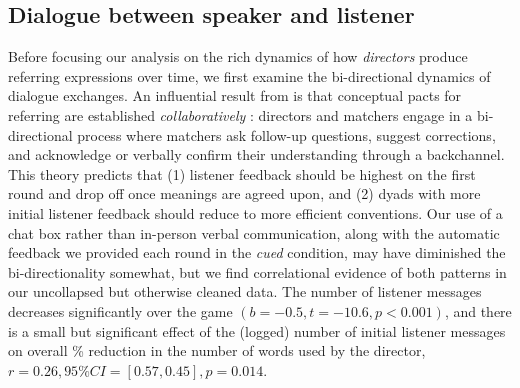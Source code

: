 \subsection{Dialogue between speaker and listener}\label{listener-feedback}

Before focusing our analysis on the rich dynamics of how \emph{directors} produce referring expressions over time, we first examine the bi-directional dynamics of dialogue exchanges. 
An influential result from is that conceptual pacts for referring are established \emph{collaboratively} \cite[see also \cite{KraussWeinheimer66_Tangrams, GarrodFayLeeOberlanderMacLeod07_GraphicalSymbolSystems}]{ClarkWilkesGibbs86_ReferringCollaborative}: 
directors and matchers engage in a bi-directional process where matchers ask follow-up questions, suggest corrections, and acknowledge or verbally confirm their understanding through a backchannel. 
This theory predicts that (1) listener feedback should be highest on the first round and drop off once meanings are agreed upon, and (2) dyads with more initial listener feedback should reduce to more efficient conventions. 
Our use of a chat box rather than in-person verbal communication, along with the automatic feedback we provided each round in the \emph{cued} condition, may have diminished the bi-directionality somewhat, but we find correlational evidence of both patterns in our uncollapsed but otherwise cleaned data. 
The number of listener messages decreases significantly over the game $(b=-0.5, t = -10.6, p < 0.001)$, and there is a small but significant effect of the (logged) number of initial listener messages on overall \% reduction in the number of words used by the director, $r = 0.26, 95\% CI = [0.57, 0.45], p = 0.014$.

